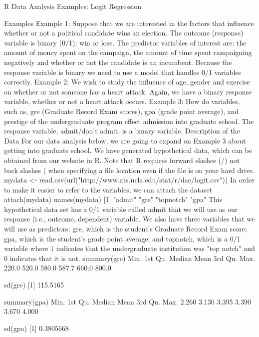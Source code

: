 R Data Analysis Examples: Logit Regression

Examples 
Example 1:  Suppose that we are interested in the factors that influence whether or not a political candidate wins an election.  The outcome (response) variable is binary (0/1);  win or lose.  The predictor variables of interest are: the amount of money spent on the campaign, the amount of time spent campaigning negatively and whether or not the candidate is an incumbent.  Because the response variable is binary we need to use a model that handles 0/1 variables correctly.  
Example 2:  We wish to study the influence of age, gender and exercise on whether or not someone has a heart attack.  Again, we have a binary response variable, whether or not a heart attack occurs.  
Example 3:  How do variables, such as, gre (Graduate Record Exam scores), gpa (grade point average), and prestige of the undergraduate program effect admission into graduate school. The response variable, admit/don't admit, is a binary variable.
Description of the Data
For our data analysis below, we are going to expand on Example 3 about getting into graduate school.  We have generated hypothetical data, which can be obtained from our website in R. Note that R requires forward slashes (/) not back slashes (\) when specifying a file location even if the file is on your hard drive. 
mydata <- read.csv(url("http://www.ats.ucla.edu/stat/r/dae/logit.csv"))
In order to make it easier to refer to the variables, we can attach the dataset
attach(mydata)
names(mydata)
[1] "admit" "gre" "topnotch" "gpa" 
This hypothetical data set has a 0/1 variable called admit that we will use as our response (i.e., outcome, dependent) variable.  We also have three variables that we will use as predictors:  gre, which is the student's Graduate Record Exam score; gpa, which is the student's grade point average; and topnotch, which is a 0/1 variable where 1 indicates that the undergraduate institution was "top notch" and 0 indicates that it is not.  
summary(gre)
Min. 1st Qu. Median Mean 3rd Qu. Max. 
220.0 520.0 580.0 587.7 660.0 800.0 

sd(gre)
[1] 115.5165

summary(gpa)
Min. 1st Qu. Median Mean 3rd Qu. Max. 
2.260 3.130 3.395 3.390 3.670 4.000 

sd(gpa)
[1] 0.3805668


